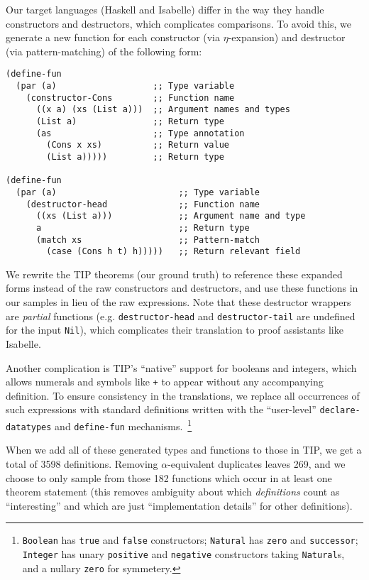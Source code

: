 Our target languages (Haskell and Isabelle) differ in the way they handle
constructors and destructors, which complicates comparisons. To avoid this, we
generate a new function for each constructor (via $\eta$-expansion) and
destructor (via pattern-matching) of the following form:

\begin{verbatim}
(define-fun
  (par (a)                   ;; Type variable
    (constructor-Cons        ;; Function name
      ((x a) (xs (List a)))  ;; Argument names and types
      (List a)               ;; Return type
      (as                    ;; Type annotation
        (Cons x xs)          ;; Return value
        (List a)))))         ;; Return type

(define-fun
  (par (a)                        ;; Type variable
    (destructor-head              ;; Function name
      ((xs (List a)))             ;; Argument name and type
      a                           ;; Return type
      (match xs                   ;; Pattern-match
        (case (Cons h t) h)))))   ;; Return relevant field
\end{verbatim}

\begin{sloppypar}
  We rewrite the TIP theorems (our ground truth) to reference these expanded
  forms instead of the raw constructors and destructors, and use these functions
  in our samples in lieu of the raw expressions. Note that these destructor
  wrappers are \emph{partial} functions (e.g. \texttt{destructor-head} and
  \texttt{destructor-tail} are undefined for the input \texttt{Nil}), which
  complicates their translation to proof assistants like Isabelle.
\end{sloppypar}

Another complication is TIP's ``native'' support for booleans and integers,
which allows numerals and symbols like \texttt{+} to appear without any
accompanying definition. To ensure consistency in the translations, we replace
all occurrences of such expressions with standard definitions written with the
``user-level'' \texttt{declare-datatypes} and \texttt{define-fun}
mechanisms.~\footnote{\texttt{Boolean} has \texttt{true} and \texttt{false}
  constructors; \texttt{Natural} has \texttt{zero} and \texttt{successor};
  \texttt{Integer} has unary \texttt{positive} and \texttt{negative}
  constructors taking \texttt{Natural}s, and a nullary \texttt{zero} for
  symmetery.}

When we add all of these generated types and functions to those in TIP, we get a
total of 3598 definitions. Removing $\alpha$-equivalent duplicates leaves 269,
and we choose to only sample from those 182 functions which occur in at least
one theorem statement (this removes ambiguity about which \emph{definitions}
count as ``interesting'' and which are just ``implementation details'' for other
definitions).

